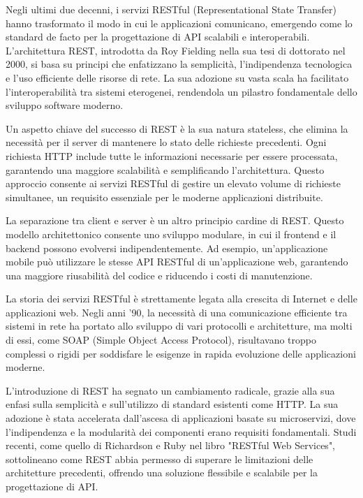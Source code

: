 \documentclass[a4paper,twoside,12pt]{toptesi}
\begin{document}
Negli ultimi due decenni, i servizi RESTful (Representational State Transfer) hanno trasformato il modo in cui le applicazioni comunicano, emergendo come lo standard de facto per la progettazione di API scalabili e interoperabili. L'architettura REST, introdotta da Roy Fielding nella sua tesi di dottorato nel 2000, si basa su principi che enfatizzano la semplicità, l'indipendenza tecnologica e l'uso efficiente delle risorse di rete. La sua adozione su vasta scala ha facilitato l'interoperabilità tra sistemi eterogenei, rendendola un pilastro fondamentale dello sviluppo software moderno.

Un aspetto chiave del successo di REST è la sua natura stateless, che elimina la necessità per il server di mantenere lo stato delle richieste precedenti. Ogni richiesta HTTP include tutte le informazioni necessarie per essere processata, garantendo una maggiore scalabilità e semplificando l'architettura. Questo approccio consente ai servizi RESTful di gestire un elevato volume di richieste simultanee, un requisito essenziale per le moderne applicazioni distribuite.

La separazione tra client e server è un altro principio cardine di REST. Questo modello architettonico consente uno sviluppo modulare, in cui il frontend e il backend possono evolversi indipendentemente. Ad esempio, un'applicazione mobile può utilizzare le stesse API RESTful di un'applicazione web, garantendo una maggiore riusabilità del codice e riducendo i costi di manutenzione.

La storia dei servizi RESTful è strettamente legata alla crescita di Internet e delle applicazioni web. Negli anni '90, la necessità di una comunicazione efficiente tra sistemi in rete ha portato allo sviluppo di vari protocolli e architetture, ma molti di essi, come SOAP (Simple Object Access Protocol), risultavano troppo complessi o rigidi per soddisfare le esigenze in rapida evoluzione delle applicazioni moderne.

L'introduzione di REST ha segnato un cambiamento radicale, grazie alla sua enfasi sulla semplicità e sull'utilizzo di standard esistenti come HTTP. La sua adozione è stata accelerata dall'ascesa di applicazioni basate su microservizi, dove l'indipendenza e la modularità dei componenti erano requisiti fondamentali. Studi recenti, come quello di Richardson e Ruby nel libro "RESTful Web Services", sottolineano come REST abbia permesso di superare le limitazioni delle architetture precedenti, offrendo una soluzione flessibile e scalabile per la progettazione di API.
\end{document}

